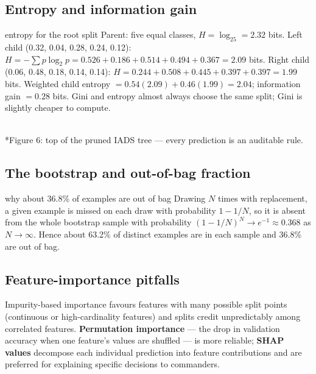 \documentclass[11pt]{article}
\begin{document}
\subsection{Entropy and information gain}
\begin{example}{entropy for the root split}
Parent: five equal classes, $H=\log_25=2.32$ bits. Left child (0.32, 0.04, 0.28, 0.24, 0.12): $H=-\sum p\log_2p=0.526+0.186+0.514+0.494+0.367=2.09$ bits. Right child (0.06, 0.48, 0.18, 0.14, 0.14): $H=0.244+0.508+0.445+0.397+0.397=1.99$ bits. Weighted child entropy $=0.54(2.09)+0.46(1.99)=2.04$; information gain $=0.28$ bits. Gini and entropy almost always choose the same split; Gini is slightly cheaper to compute.
\end{example}

\begin{center}\\*{\small\color{GreyN}Figure 6: top of the pruned IADS tree --- every prediction is an auditable rule.}\end{center}

\subsection{The bootstrap and out-of-bag fraction}
\begin{derivation}{why about 36.8\% of examples are out of bag}
Drawing $N$ times with replacement, a given example is missed on each draw with probability $1-1/N$, so it is absent from the whole bootstrap sample with probability $(1-1/N)^N\to e^{-1}\approx0.368$ as $N\to\infty$. Hence about 63.2\% of distinct examples are in each sample and 36.8\% are out of bag.
\end{derivation}

\subsection{Feature-importance pitfalls}
Impurity-based importance favours features with many possible split points (continuous or high-cardinality features) and splits credit unpredictably among correlated features. \textbf{Permutation importance} --- the drop in validation accuracy when one feature's values are shuffled --- is more reliable; \textbf{SHAP values} decompose each individual prediction into feature contributions and are preferred for explaining specific decisions to commanders.
\end{document}
